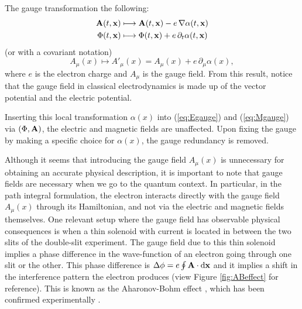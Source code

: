\documentclass[a4paper]{report}
\begin{document}
\begin{spacing}{1.1}
The gauge transformation the following:
\begin{align}
    \vb{A}(t,\vb{x}) &\longmapsto \vb{A}(t,\vb{x}) - e\,\nabla\alpha(t,\vb{x}) \\
    \Phi(t,\vb{x}) &\longmapsto \Phi(t,\vb{x}) + e\,\partial_t \alpha(t,\vb{x}) 
\end{align}
(or with a covariant notation)
\begin{equation}
    A_\mu(x) \mapsto A'_\mu(x) = A_\mu(x) + e\,\partial_\mu \alpha(x),
\end{equation}
where $e$ is the electron charge and $A_\mu$ is the gauge field. From this result, notice that the gauge field in classical electrodynamics is made up of the vector potential and the electric potential.

Inserting this local transformation $\alpha(x)$ into (\ref{eq:Egauge}) and (\ref{eq:Mgauge}) via $(\Phi, \vb{A})$, the electric and magnetic fields are unaffected. Upon fixing the gauge by making a specific choice for $\alpha(x)$, the gauge redundancy is removed.

Although it seems that introducing the gauge field $A_\mu (x) $ is unnecessary for obtaining an accurate physical description, it is important to note that gauge fields are necessary when we go to the quantum context. In particular, in the path integral formulation, the electron interacts directly with the gauge field $A_\mu (x)$ through its Hamiltonian, and not via the electric and magnetic fields themselves. One relevant setup where the gauge field has observable physical consequences is when a thin solenoid with current is located in between the two slits of the double-slit experiment. The gauge field due to this thin solenoid implies a phase difference in the wave-function of an electron going through one slit or the other. This phase difference is $\Delta \phi = e \oint \vb{A}\cdot \dd \vb{x}$ and it implies a shift in the interference pattern the electron produces (view Figure \ref{fig:ABeffect} for reference). This is known as the Aharonov-Bohm effect \cite{aharonov1959significance}, which has been confirmed experimentally \cite{batelaan2009aharonov}. 


\end{spacing}
\end{document}
